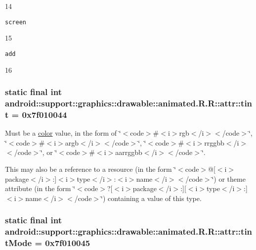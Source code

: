 14

{\tt screen}

15

{\tt add}

16\hypertarget{classandroid_1_1support_1_1graphics_1_1drawable_1_1animated_1_1_r_1_1attr_cd37accb4e6bde08c69dda1a0e66e979}{
\subsubsection[{tint}]{\setlength{\rightskip}{0pt plus 5cm}static final int android::support::graphics::drawable::animated.R.R::attr::tint = 0x7f010044}}
\label{classandroid_1_1support_1_1graphics_1_1drawable_1_1animated_1_1_r_1_1attr_cd37accb4e6bde08c69dda1a0e66e979}


Must be a \hyperlink{classandroid_1_1support_1_1graphics_1_1drawable_1_1animated_1_1_r_1_1color}{color} value, in the form of \char`\"{}$<$code$>$\#$<$i$>$rgb$<$/i$>$$<$/code$>$\char`\"{}, \char`\"{}$<$code$>$\#$<$i$>$argb$<$/i$>$$<$/code$>$\char`\"{}, \char`\"{}$<$code$>$\#$<$i$>$rrggbb$<$/i$>$$<$/code$>$\char`\"{}, or \char`\"{}$<$code$>$\#$<$i$>$aarrggbb$<$/i$>$$<$/code$>$\char`\"{}. 

This may also be a reference to a resource (in the form \char`\"{}$<$code$>$@\mbox{[}$<$i$>$package$<$/i$>$:\mbox{]}$<$i$>$type$<$/i$>$:$<$i$>$name$<$/i$>$$<$/code$>$\char`\"{}) or theme attribute (in the form \char`\"{}$<$code$>$?\mbox{[}$<$i$>$package$<$/i$>$:\mbox{]}\mbox{[}$<$i$>$type$<$/i$>$:\mbox{]}$<$i$>$name$<$/i$>$$<$/code$>$\char`\"{}) containing a value of this type. \hypertarget{classandroid_1_1support_1_1graphics_1_1drawable_1_1animated_1_1_r_1_1attr_89c4c5f17af3c7b62221000d2fc07de2}{
\subsubsection[{tintMode}]{\setlength{\rightskip}{0pt plus 5cm}static final int android::support::graphics::drawable::animated.R.R::attr::tintMode = 0x7f010045}}
\label{classandroid_1_1support_1_1graphics_1_1drawable_1_1animated_1_1_r_1_1attr_89c4c5f17af3c7b62221000d2fc07de2}


